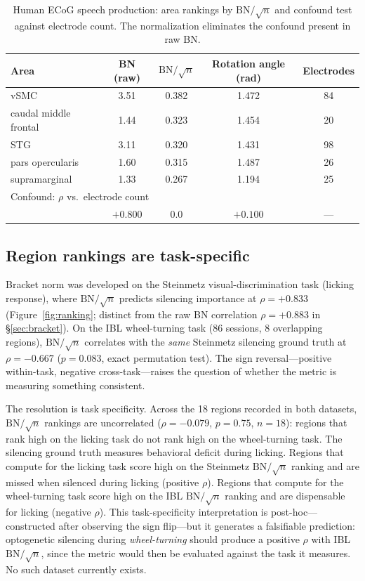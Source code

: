 \documentclass[9pt,lineno]{elife}
\begin{document}
\begin{table}[t]
\centering
\caption{Human ECoG speech production: area rankings by $\text{BN}/\!\sqrt{n}$ and confound test against electrode count. The normalization eliminates the confound present in raw BN.}
\label{tab:ecog}
\small
\begin{tabular}{lcccc}
\toprule
Area & BN (raw) & $\text{BN}/\!\sqrt{n}$ & Rotation angle (rad) & Electrodes \\
\midrule
vSMC & 3.51 & 0.382 & 1.472 & 84 \\
caudal middle frontal & 1.44 & 0.323 & 1.454 & 20 \\
STG & 3.11 & 0.320 & 1.431 & 98 \\
pars opercularis & 1.60 & 0.315 & 1.487 & 26 \\
supramarginal & 1.33 & 0.267 & 1.194 & 25 \\
\midrule
\multicolumn{5}{l}{Confound: $\rho$ vs.\ electrode count} \\
\midrule
 & $+0.800$ & $0.0$ & $+0.100$ & --- \\
\bottomrule
\end{tabular}
\end{table}

\subsection{Region rankings are task-specific}
\label{sec:scope}

Bracket norm was developed on the Steinmetz visual-discrimination task (licking response), where $\text{BN}/\!\sqrt{n}$ predicts silencing importance at $\rho = +0.833$ (Figure~\ref{fig:ranking}; distinct from the raw BN correlation $\rho = +0.883$ in \S\ref{sec:bracket}). On the IBL wheel-turning task (86 sessions, 8 overlapping regions), $\text{BN}/\!\sqrt{n}$ correlates with the \emph{same} Steinmetz silencing ground truth at $\rho = -0.667$ ($p = 0.083$, exact permutation test). The sign reversal---positive within-task, negative cross-task---raises the question of whether the metric is measuring something consistent.

The resolution is task specificity. Across the 18 regions recorded in both datasets, $\text{BN}/\!\sqrt{n}$ rankings are uncorrelated ($\rho = -0.079$, $p = 0.75$, $n = 18$): regions that rank high on the licking task do not rank high on the wheel-turning task. The silencing ground truth measures behavioral deficit during licking. Regions that compute for the licking task score high on the Steinmetz $\text{BN}/\!\sqrt{n}$ ranking and are missed when silenced during licking (positive $\rho$). Regions that compute for the wheel-turning task score high on the IBL $\text{BN}/\!\sqrt{n}$ ranking and are dispensable for licking (negative $\rho$). This task-specificity interpretation is post-hoc---constructed after observing the sign flip---but it generates a falsifiable prediction: optogenetic silencing during \emph{wheel-turning} should produce a positive $\rho$ with IBL $\text{BN}/\!\sqrt{n}$, since the metric would then be evaluated against the task it measures. No such dataset currently exists.
\end{document}

